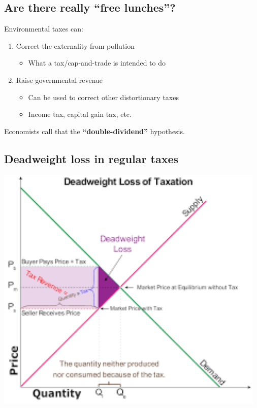 \documentclass[
]{article}
\providecommand{\tightlist}{%
  \setlength{\itemsep}{0pt}\setlength{\parskip}{0pt}}
\begin{document}
\hypertarget{are-there-really-free-lunches}{%
\subsection{Are there really ``free
lunches''?}\label{are-there-really-free-lunches}}

Environmental taxes can:

\begin{enumerate}
\def\labelenumi{\arabic{enumi}.}
\tightlist
\item
  Correct the externality from pollution

  \begin{itemize}
  \tightlist
  \item
    What a tax/cap-and-trade is intended to do
  \end{itemize}
\item
  Raise governmental revenue

  \begin{itemize}
  \tightlist
  \item
    Can be used to correct other distortionary taxes
  \item
    Income tax, capital gain tax, etc.
  \end{itemize}
\end{enumerate}

Economists call that the \textbf{``double-dividend''} hypothesis.

\hypertarget{deadweight-loss-in-regular-taxes}{%
\subsection{Deadweight loss in regular
taxes}\label{deadweight-loss-in-regular-taxes}}

\includegraphics[width=\textwidth,height=4.6875in]{figures/m7_dwl.png}
\end{document}
